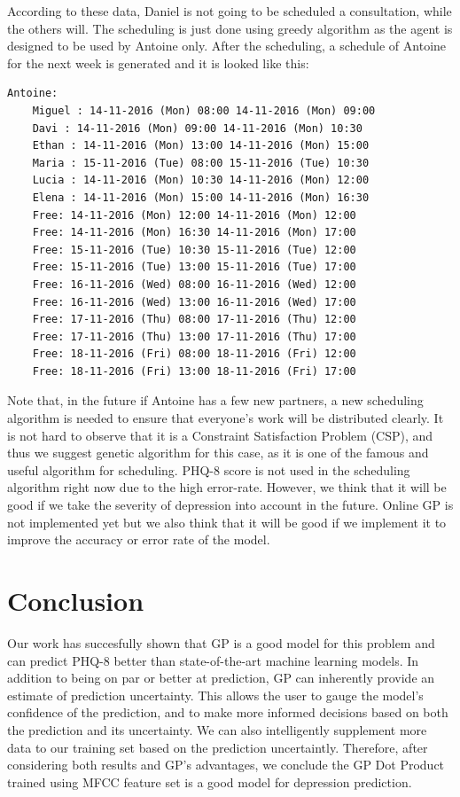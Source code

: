 \documentclass{article}
\begin{document}
	According to these data, Daniel is not going to be scheduled a consultation, while the others will.
	The scheduling is just done using greedy algorithm as the agent is designed to be used by Antoine only.
	After the scheduling, a schedule of Antoine for the next week is generated and it is looked like this:
	\begin{Verbatim}[fontsize=\tiny]
	Antoine:
	Miguel : 14-11-2016 (Mon) 08:00 14-11-2016 (Mon) 09:00
	Davi : 14-11-2016 (Mon) 09:00 14-11-2016 (Mon) 10:30
	Ethan : 14-11-2016 (Mon) 13:00 14-11-2016 (Mon) 15:00
	Maria : 15-11-2016 (Tue) 08:00 15-11-2016 (Tue) 10:30
	Lucia : 14-11-2016 (Mon) 10:30 14-11-2016 (Mon) 12:00
	Elena : 14-11-2016 (Mon) 15:00 14-11-2016 (Mon) 16:30
	Free: 14-11-2016 (Mon) 12:00 14-11-2016 (Mon) 12:00
	Free: 14-11-2016 (Mon) 16:30 14-11-2016 (Mon) 17:00
	Free: 15-11-2016 (Tue) 10:30 15-11-2016 (Tue) 12:00
	Free: 15-11-2016 (Tue) 13:00 15-11-2016 (Tue) 17:00
	Free: 16-11-2016 (Wed) 08:00 16-11-2016 (Wed) 12:00
	Free: 16-11-2016 (Wed) 13:00 16-11-2016 (Wed) 17:00
	Free: 17-11-2016 (Thu) 08:00 17-11-2016 (Thu) 12:00
	Free: 17-11-2016 (Thu) 13:00 17-11-2016 (Thu) 17:00
	Free: 18-11-2016 (Fri) 08:00 18-11-2016 (Fri) 12:00
	Free: 18-11-2016 (Fri) 13:00 18-11-2016 (Fri) 17:00
	\end{Verbatim}
	
	Note that, in the future if Antoine has a few new partners, a new scheduling algorithm is needed to ensure that everyone's work will be distributed clearly.
	It is not hard to observe that it is a Constraint Satisfaction Problem (CSP), and thus we suggest genetic algorithm for this case, 
	as it is one of the famous and useful algorithm for scheduling. 
	PHQ-8 score is not used in the scheduling algorithm right now due to the high error-rate. 
	However, we think that it will be good if we take the severity of depression into account in the future. 
	Online GP is not implemented yet but we also think that it will be good if we implement it to improve the accuracy or error rate of the model.
	
	\section{Conclusion}	
	Our work has succesfully shown that GP is a good model for this problem and can predict PHQ-8 better than state-of-the-art machine learning models. 
	In addition to being on par or better at prediction, GP can inherently provide an estimate of prediction uncertainty. 
	This allows the user to gauge the model's confidence of the prediction, and to make more informed decisions based on both the prediction and its uncertainty. 
	We can also intelligently supplement more data to our training set based on the prediction uncertaintly. 
	Therefore, after considering both results and GP's advantages, we conclude the GP Dot Product trained using MFCC feature set is a good model for 
	depression prediction.
	
\end{document}
